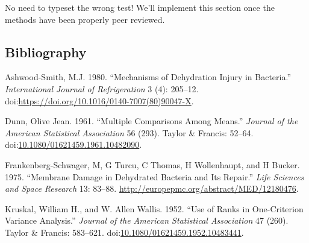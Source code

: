 \documentclass[12pt,]{article}
\begin{document}
No need to typeset the wrong test! We'll implement this section once the
methods have been properly peer reviewed.

\subsection*{Bibliography}\label{bibliography}

\hypertarget{refs}{}
\hypertarget{ref-ASHWOODSMITH1980205}{}
Ashwood-Smith, M.J. 1980. ``Mechanisms of Dehydration Injury in
Bacteria.'' \emph{International Journal of Refrigeration} 3 (4):
205--12.
doi:\href{https://doi.org/https://doi.org/10.1016/0140-7007(80)90047-X}{https://doi.org/10.1016/0140-7007(80)90047-X}.

\hypertarget{ref-DUNN}{}
Dunn, Olive Jean. 1961. ``Multiple Comparisons Among Means.''
\emph{Journal of the American Statistical Association} 56 (293). Taylor
\& Francis: 52--64.
doi:\href{https://doi.org/10.1080/01621459.1961.10482090}{10.1080/01621459.1961.10482090}.

\hypertarget{ref-PMID:12180476}{}
Frankenberg-Schwager, M, G Turcu, C Thomas, H Wollenhaupt, and H Bucker.
1975. ``Membrane Damage in Dehydrated Bacteria and Its Repair.''
\emph{Life Sciences and Space Research} 13: 83--88.
\url{http://europepmc.org/abstract/MED/12180476}.

\hypertarget{ref-KruskalWallis}{}
Kruskal, William H., and W. Allen Wallis. 1952. ``Use of Ranks in
One-Criterion Variance Analysis.'' \emph{Journal of the American
Statistical Association} 47 (260). Taylor \& Francis: 583--621.
doi:\href{https://doi.org/10.1080/01621459.1952.10483441}{10.1080/01621459.1952.10483441}.
\end{document}
